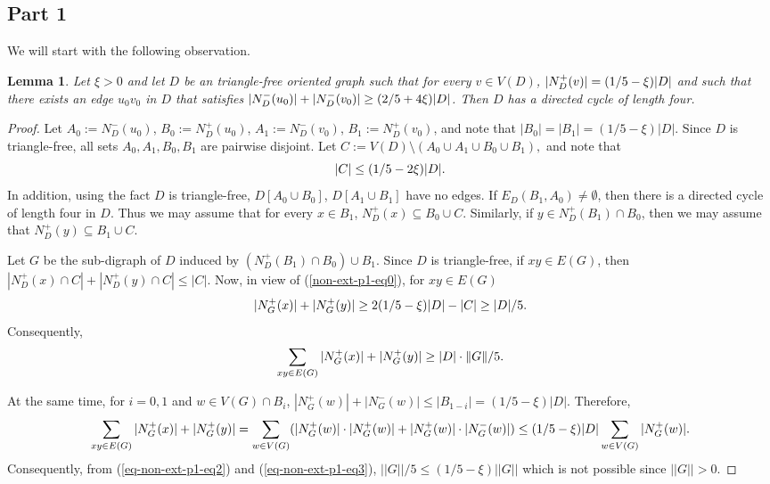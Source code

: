 \documentclass{article}
\newtheorem{lemma}[theorem]{Lemma}
\DeclarePairedDelimiter{\abs}{\lvert}{\rvert}
\begin{document}
\subsection{Part 1}
 We will start with the following observation.
\begin{lemma}\label{non-ext-lem01}Let $\xi>0$ and let $D$ be an triangle-free oriented graph such that for every $v\in V(D)$, $|N^+_D(v)|= (1/5-\xi)\abs{D}$ and  such that there exists an edge $u_0v_0$ in $D$ that satisfies $|N^-_D(u_0)|+|N^-_D(v_0)|\geq (2/5+ 4\xi)\abs{D}$. Then $D$ has a directed cycle of length four.
\end{lemma}
\begin{proof}
Let $A_0:=N^-_D(u_0)$, $B_0:=N^+_D(u_0)$, $A_1:=N^-_D(v_0)$, $B_1:=N^+_D(v_0)$, and note that $|B_0|=  |B_1| = (1/5-\xi)|D|$. Since $D$ is triangle-free, all sets $A_0, A_1, B_0, B_1$ are pairwise disjoint.
Let $C:=V(D)\setminus (A_0\cup A_1\cup B_0\cup B_1),$ and note that
\begin{equation}\label{non-ext-p1-eq0}
|C|\leq (1/5- 2\xi)\abs{D}.
\end{equation}
 In addition, using the fact $D$ is triangle-free, $D[A_0\cup B_0]$, $D[A_1\cup B_1]$ have no edges. 
 If $E_D(B_1,A_0)\neq \emptyset$, then there is a directed  cycle of length four in $D$. Thus we may assume that for every $x\in B_1$, $N^+_D(x)\subseteq B_0\cup C.$ Similarly, if $y\in N^+_D(B_1)\cap B_0$, then we may 
 assume that $N^+_D(y)\subseteq B_1\cup C$. %
 
 Let $G$ be the sub-digraph of $D$ induced by $(N^+_D(B_1) \cap B_0) \cup B_1$. %
Since $D$ is triangle-free, if $xy\in E(G)$, then  $|N^+_D(x)\cap C|+ |N^+_D(y)\cap C|\leq |C|$. Now, in view of (\ref{non-ext-p1-eq0}), for $xy\in E(G)$ 
\begin{equation}\label{eq-non-ext-p1-eq1}
|N^+_G(x)|+|N^+_G(y)|\geq 2(1/5-\xi)\abs{D}-|C|\geq \abs{D}/5.
\end{equation}
Consequently,
\begin{equation}\label{eq-non-ext-p1-eq2}\sum_{xy\in E(G)} |N^+_G(x)|+|N^+_G(y)| \geq \abs{D}\cdot \|G\|/5.\end{equation}

At the same time, for $i=0,1$ and $w\in V(G)\cap B_i$, $|N^+_G(w)|+|N^-_G(w)|\leq |B_{1-i}|=(1/5-\xi)|D|$. Therefore,
\begin{equation}\label{eq-non-ext-p1-eq3}\sum_{xy\in E(G)} |N^+_G(x)|+|N^+_G(y)|=\sum_{w\in V(G)}(|N^+_G(w)|\cdot |N^+_G(w)|+|N^+_G(w)|\cdot |N^-_G(w)|)\leq (1/5-\xi)\abs{D} \sum_{w\in V(G)} |N^+_G(w)|.\end{equation}
 Consequently, from (\ref{eq-non-ext-p1-eq2}) and (\ref{eq-non-ext-p1-eq3}),
$||G||/5 \leq (1/5-\xi)||G||$ which is not possible since $||G||>0$.

\end{proof}
\end{document}
